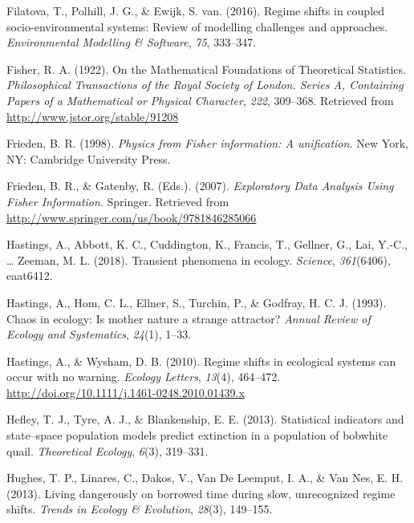 \documentclass[12pt,twoside,openany]{reedthesis}
\begin{document}
\leavevmode\hypertarget{ref-filatova2016regime}{}%
Filatova, T., Polhill, J. G., \& Ewijk, S. van. (2016). Regime shifts in coupled socio-environmental systems: Review of modelling challenges and approaches. \emph{Environmental Modelling \& Software}, \emph{75}, 333--347.

\leavevmode\hypertarget{ref-fisher_mathematical_1922}{}%
Fisher, R. A. (1922). On the Mathematical Foundations of Theoretical Statistics. \emph{Philosophical Transactions of the Royal Society of London. Series A, Containing Papers of a Mathematical or Physical Character}, \emph{222}, 309--368. Retrieved from \url{http://www.jstor.org/stable/91208}

\leavevmode\hypertarget{ref-frieden_physics_1998}{}%
Frieden, B. R. (1998). \emph{Physics from Fisher information: A unification.} New York, NY: Cambridge University Press.

\leavevmode\hypertarget{ref-frieden_exploratory_2007}{}%
Frieden, B. R., \& Gatenby, R. (Eds.). (2007). \emph{Exploratory Data Analysis Using Fisher Information}. Springer. Retrieved from \url{http://www.springer.com/us/book/9781846285066}

\leavevmode\hypertarget{ref-hastings2018transient}{}%
Hastings, A., Abbott, K. C., Cuddington, K., Francis, T., Gellner, G., Lai, Y.-C., \ldots{} Zeeman, M. L. (2018). Transient phenomena in ecology. \emph{Science}, \emph{361}(6406), eaat6412.

\leavevmode\hypertarget{ref-hastings1993chaos}{}%
Hastings, A., Hom, C. L., Ellner, S., Turchin, P., \& Godfray, H. C. J. (1993). Chaos in ecology: Is mother nature a strange attractor? \emph{Annual Review of Ecology and Systematics}, \emph{24}(1), 1--33.

\leavevmode\hypertarget{ref-hastings_regime_2010}{}%
Hastings, A., \& Wysham, D. B. (2010). Regime shifts in ecological systems can occur with no warning. \emph{Ecology Letters}, \emph{13}(4), 464--472. \url{http://doi.org/10.1111/j.1461-0248.2010.01439.x}

\leavevmode\hypertarget{ref-hefley2013statistical}{}%
Hefley, T. J., Tyre, A. J., \& Blankenship, E. E. (2013). Statistical indicators and state--space population models predict extinction in a population of bobwhite quail. \emph{Theoretical Ecology}, \emph{6}(3), 319--331.

\leavevmode\hypertarget{ref-hughes_living_2013}{}%
Hughes, T. P., Linares, C., Dakos, V., Van De Leemput, I. A., \& Van Nes, E. H. (2013). Living dangerously on borrowed time during slow, unrecognized regime shifts. \emph{Trends in Ecology \& Evolution}, \emph{28}(3), 149--155.
\end{document}
